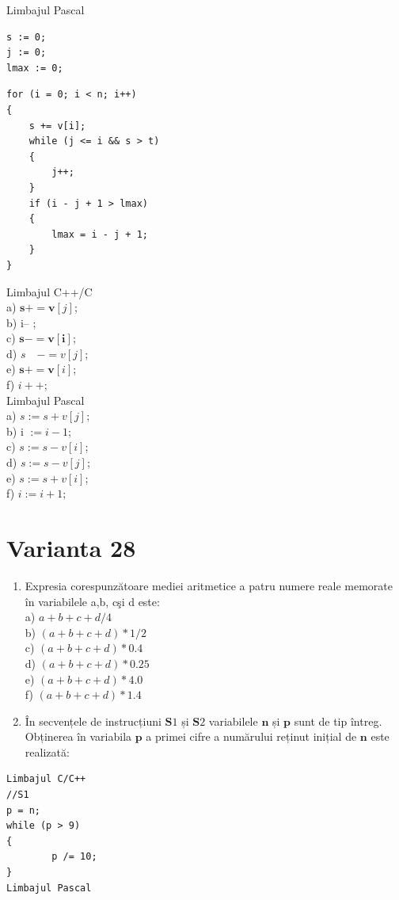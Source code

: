 \documentclass[10pt]{article}
\begin{document}
Limbajul Pascal

\begin{verbatim}
s := 0;
j := 0;
lmax := 0;
\end{verbatim}

\begin{verbatim}
for (i = 0; i < n; i++)
{
    s += v[i];
    while (j <= i && s > t)
    {
        j++;
    }
    if (i - j + 1 > lmax)
    {
        lmax = i - j + 1;
    }
}
\end{verbatim}

Limbajul C++/C\\
a) $\mathbf{s}+=\mathbf{v}[j]$;\\
b) i-- ;\\
c) $\mathbf{s}-=\mathbf{v}[\mathbf{i}]$;\\
d) $s \quad-=v[j]$;\\
e) $\mathbf{s}+=\mathbf{v}[i]$;\\
f) $i++$;\\
Limbajul Pascal\\
a) $s:=s+v[j]$;\\
b) i $:=i-1$;\\
c) $s:=s-v[i]$;\\
d) $s:=s-v[j]$;\\
e) $s:=s+v[i]$;\\
f) $i:=i+1$;

\section*{Varianta 28}
\begin{enumerate}
  \item Expresia corespunzătoare mediei aritmetice a patru numere reale memorate în variabilele a,b, cşi d este:\\
a) $a+b+c+d / 4$\\
b) $(a+b+c+d) * 1 / 2$\\
c) $(a+b+c+d) * 0.4$\\
d) $(a+b+c+d) * 0.25$\\
e) $(a+b+c+d) * 4.0$\\
f) $(a+b+c+d) * 1.4$
  \item În secvențele de instrucțiuni $\mathbf{S} 1$ și $\mathbf{S} 2$ variabilele $\mathbf{n}$ și $\mathbf{p}$ sunt de tip întreg. Obținerea în variabila $\mathbf{p}$ a primei cifre a numărului reținut inițial de $\mathbf{n}$ este realizată:
\end{enumerate}

\begin{verbatim}
Limbajul C/C++
//S1
p = n;
while (p > 9)
{
        p /= 10;
}
Limbajul Pascal
\end{verbatim}
\end{document}
